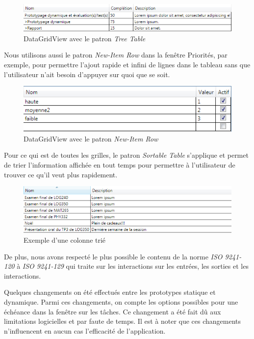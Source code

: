 \documentclass[letterpaper, oneside, 12pt, these, creativecommons]{thETS}
\begin{document}
\begin{figure}[H!]
	\centering
	\includegraphics[width=1\textwidth]{tree_table.png}
	\caption{DataGridView avec le patron \emph{Tree Table}}
\end{figure}

Nous utilisons aussi le patron \emph{New-Item Row} dans la fenêtre Priorités, par exemple, pour permettre l'ajout rapide et infini de lignes dans le tableau sans que l'utilisateur n'ait besoin d'appuyer sur quoi que se soit. 

\begin{figure}[H!]
	\centering
	\includegraphics[width=1\textwidth]{new_item_row.png}
	\caption{DataGridView avec le patron \emph{New-Item Row}}
\end{figure}

Pour ce qui est de toutes les grilles, le patron \emph{Sortable Table} s'applique et permet de trier l'information affichée en tout temps pour permettre à l'utilisateur de trouver ce qu'il veut plus rapidement.

\begin{figure}[H!]
	\centering
	\includegraphics[width=1\textwidth]{sortable_table.png}
	\caption{Exemple d'une colonne trié}
\end{figure}

De plus, nous avons respecté le plus possible le contenu de la norme \emph{ISO 9241-120} à \emph{ISO 9241-129} qui traite sur les interactions sur les entrées, les sorties et les interactions.

Quelques changements on été effectués entre les prototypes statique et dynamique. Parmi ces changements, on compte les options possibles pour une échéance dans la fenêtre sur les tâches. Ce changement a été fait dû aux limitations logicielles et par faute de temps. Il est à noter que ces changements n'influencent en aucun cas l'efficacité de l'application.
\end{document}
